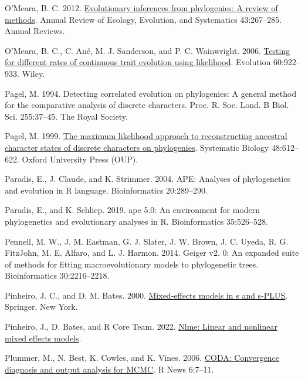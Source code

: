 \documentclass[fleqn,10pt,lineno]{wlpeerj} %
\newlength{\cslhangindent}
\newenvironment{CSLReferences}[2] %
 {\begin{list}{}{%
  \setlength{\itemindent}{0pt}
  \setlength{\leftmargin}{0pt}
  \setlength{\parsep}{0pt}
  \ifodd #1
   \setlength{\leftmargin}{\cslhangindent}
   \setlength{\itemindent}{-1\cslhangindent}
  \fi
  \setlength{\itemsep}{#2\baselineskip}}}
 {\end{list}}
\begin{document}
\begin{CSLReferences}{1}{0}
O'Meara, B. C. 2012. \href{https://doi.org/10.1146/annurev-ecolsys-110411-160331}{Evolutionary inferences from phylogenies: A review of methods}. Annual Review of Ecology, Evolution, and Systematics 43:267--285. Annual Reviews.

O'Meara, B. C., C. Ané, M. J. Sanderson, and P. C. Wainwright. 2006. \href{https://doi.org/10.1111/j.0014-3820.2006.tb01171.x}{Testing for different rates of continuous trait evolution using likelihood}. Evolution 60:922--933. Wiley.

Pagel, M. 1994. Detecting correlated evolution on phylogenies: A general method for the comparative analysis of discrete characters. Proc. R. Soc. Lond. B Biol. Sci. 255:37--45. The Royal Society.

Pagel, M. 1999. \href{https://doi.org/10.1080/106351599260184}{The maximum likelihood approach to reconstructing ancestral character states of discrete characters on phylogenies}. Systematic Biology 48:612--622. Oxford University Press (OUP).

Paradis, E., J. Claude, and K. Strimmer. 2004. {APE}: Analyses of phylogenetics and evolution in {R} language. Bioinformatics 20:289--290.

Paradis, E., and K. Schliep. 2019. {ape} 5.0: An environment for modern phylogenetics and evolutionary analyses in {R}. Bioinformatics 35:526--528.

Pennell, M. W., J. M. Eastman, G. J. Slater, J. W. Brown, J. C. Uyeda, R. G. FitzJohn, M. E. Alfaro, and L. J. Harmon. 2014. Geiger v2. 0: An expanded suite of methods for fitting macroevolutionary models to phylogenetic trees. Bioinformatics 30:2216--2218.

Pinheiro, J. C., and D. M. Bates. 2000. \href{https://doi.org/10.1007/b98882}{Mixed-effects models in s and s-PLUS}. Springer, New York.

Pinheiro, J., D. Bates, and R Core Team. 2022. \href{https://CRAN.R-project.org/package=nlme}{Nlme: Linear and nonlinear mixed effects models}.

Plummer, M., N. Best, K. Cowles, and K. Vines. 2006. \href{https://journal.r-project.org/archive/}{CODA: Convergence diagnosis and output analysis for MCMC}. R News 6:7--11.


\end{CSLReferences}
\end{document}
